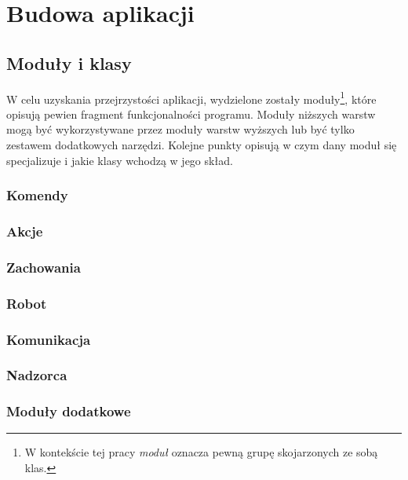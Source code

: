 \chapter{Budowa aplikacji}

\section{Moduły i klasy}
W celu uzyskania przejrzystości aplikacji, wydzielone zostały moduły\footnote{W kontekście tej pracy \textit{moduł} oznacza pewną grupę skojarzonych ze sobą klas.}, które opisują pewien fragment funkcjonalności programu. Moduły niższych warstw mogą być wykorzystywane przez moduły warstw wyższych lub być tylko zestawem dodatkowych narzędzi. Kolejne punkty opisują w czym dany moduł się specjalizuje i jakie klasy wchodzą w jego skład.

\subsection{Komendy}

\subsection{Akcje}

\subsection{Zachowania}

\subsection{Robot}

\subsection{Komunikacja}

\subsection{Nadzorca}

\subsection{Moduły dodatkowe}
